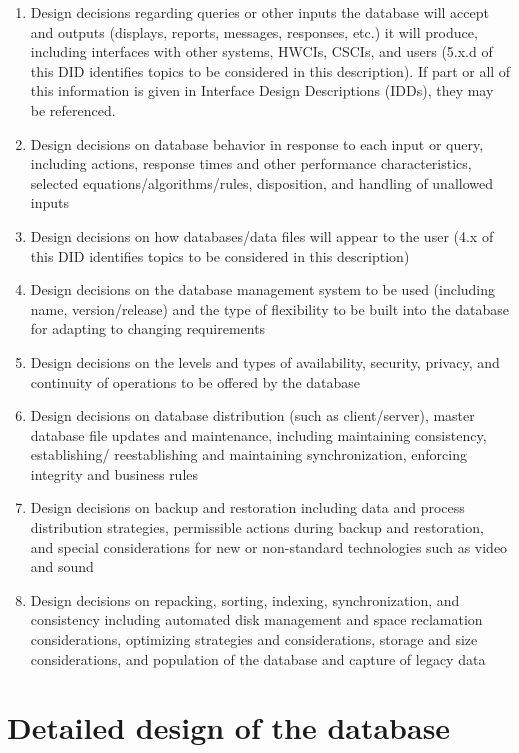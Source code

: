 \documentclass{fidata-report-template}
\begin{document}
\begin{enumerate}
\itemsep1pt\parskip0pt
\item
  Design decisions regarding queries or other inputs the database will
  accept and outputs (displays, reports, messages, responses, etc.) it
  will produce, including interfaces with other systems, HWCIs, CSCIs,
  and users (5.x.d of this DID identifies topics to be considered in
  this description). If part or all of this information is given in
  Interface Design Descriptions (IDDs), they may be referenced.
\item
  Design decisions on database behavior in response to each input or
  query, including actions, response times and other performance
  characteristics, selected equations/algorithms/rules, disposition, and
  handling of unallowed inputs
\item
  Design decisions on how databases/data files will appear to the user
  (4.x of this DID identifies topics to be considered in this
  description)
\item
  Design decisions on the database management system to be used
  (including name, version/release) and the type of flexibility to be
  built into the database for adapting to changing requirements
\item
  Design decisions on the levels and types of availability, security,
  privacy, and continuity of operations to be offered by the database
\item
  Design decisions on database distribution (such as client/server),
  master database file updates and maintenance, including maintaining
  consistency, establishing/ reestablishing and maintaining
  synchronization, enforcing integrity and business rules
\item
  Design decisions on backup and restoration including data and process
  distribution strategies, permissible actions during backup and
  restoration, and special considerations for new or non-standard
  technologies such as video and sound
\item
  Design decisions on repacking, sorting, indexing, synchronization, and
  consistency including automated disk management and space reclamation
  considerations, optimizing strategies and considerations, storage and
  size considerations, and population of the database and capture of
  legacy data
\end{enumerate}

\section{Detailed design of the database}
\end{document}

